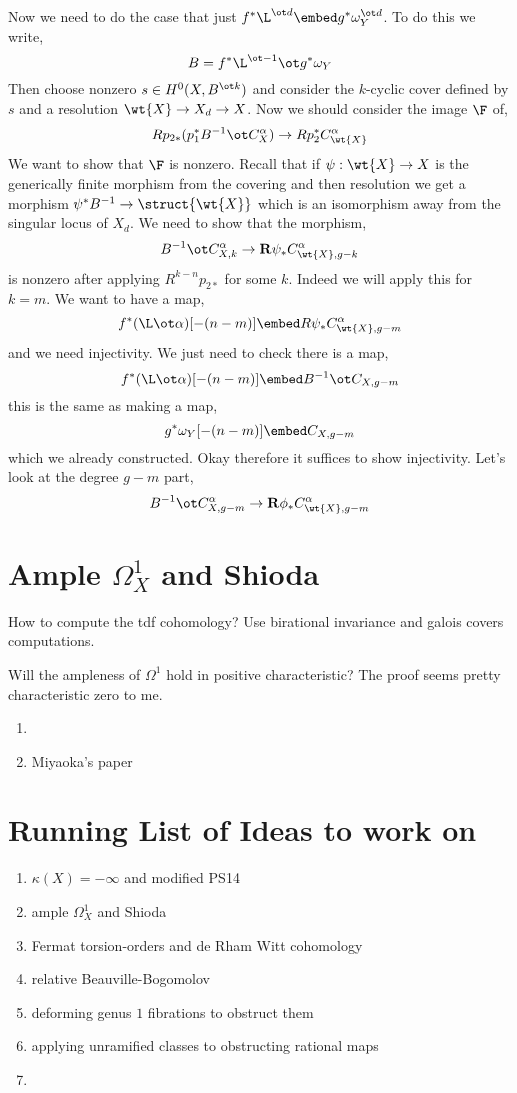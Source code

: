 \documentclass[12pt]{article}
\begin{document}
Now we need to do the case that just $f^* \L^{\ot d} \embed g^* \omega_Y^{\ot d}$. To do this we write,
\[ B = f^* \L^{\ot -1} \ot g^* \omega_Y \]
Then choose nonzero $s \in H^0(X, B^{\ot k})$ and consider the $k$-cyclic cover defined by $s$ and a resolution $\wt{X} \to X_d \to X$. Now we should consider the image $\F$ of,
\[ R p_{2*} (p_1^* B^{-1} \ot C_X^\alpha) \to R p_2^* C^\alpha_{\wt{X}} \]
We want to show that $\F$ is nonzero. Recall that if $\psi : \wt{X} \to X$ is the generically finite morphism from the covering and then resolution we get a morphism $\psi^{*} B^{-1} \to \struct{\wt{X}}$ which is an isomorphism away from the singular locus of $X_d$. We need to show that the morphism,
\[ B^{-1} \ot C_{X, k}^\alpha \to \R \psi_* C^\alpha_{\wt{X}, g-k} \]
is nonzero after applying $R^{k-n} p_{2*}$ for some $k$. Indeed we will apply this for $k = m$. We want to have a map,
\[ f^* (\L \ot \alpha)[-(n-m)] \embed R \psi_* C^\alpha_{\wt{X}, g-m} \]
and we need injectivity. We just need to check there is a map,
\[ f^* (\L \ot \alpha)[-(n-m)] \embed B^{-1} \ot C_{X, g-m} \]
this is the same as making a map,
\[ g^* \omega_Y [-(n-m)] \embed C_{X, g-m} \]
which we already constructed. Okay therefore it suffices to show injectivity. Let's look at the degree $g-m$ part,
\[ B^{-1} \ot C_{X, g-m}^\alpha \to \R \phi_* C^\alpha_{\wt{X}, g-m} \]

\section{Ample $\Omega^1_X$ and Shioda}

How to compute the tdf cohomology? Use birational invariance and galois covers computations.

Will the ampleness of $\Omega^1$ hold in positive characteristic? The proof seems pretty characteristic zero to me.

\begin{enumerate}
\item {}

\item Miyaoka's paper
\end{enumerate}

\section{Running List of Ideas to work on}

\begin{enumerate}
\item $\kappa(X) = - \infty$ and modified PS14
\item ample $\Omega^1_X$ and Shioda
\item Fermat torsion-orders and de Rham Witt cohomology
\item relative Beauville-Bogomolov
\item deforming genus $1$ fibrations to obstruct them
\item applying unramified classes to obstructing rational maps
\item 
\end{enumerate}
\end{document}
